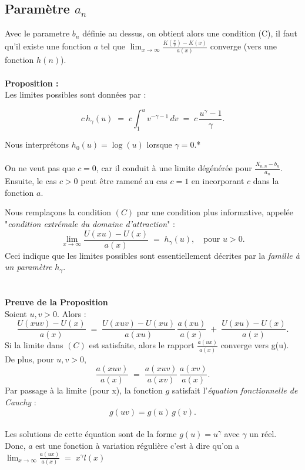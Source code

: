 \documentclass{article}
\begin{document}
\subsection{Paramètre $a_n$}
Avec le parametre $b_n$ définie au dessus, on obtient alors une condition (C), il faut qu'il existe une fonction $a$ tel que $\lim_{x \to \infty} \frac{K(\frac{x}{v}) - K(x)}{a(x)}$ converge (vers une fonction $h(n)$). 
\\
\\
\textbf{Proposition :}
\\
Les limites possibles sont données par :

\begin{equation}\label{eq:1.2}
    c\,h_{\gamma}(u) 
    \;=\; 
    c \int_{1}^{u} v^{-\gamma - 1}\,dv 
    \;=\; 
    c\,\frac{u^{\gamma} - 1}{\gamma}.
\end{equation}

Nous interprétons $h_{0}(u) = \log(u)$ lorsque $\gamma = 0$.*
\\
\\
\; On ne veut pas que $c=0$, car il conduit à une limite dégénérée pour $\frac{X_{n,n} - b_n}{a_n}$. 
Ensuite, le cas $c>0$ peut être ramené au cas $c=1$ en incorporant $c$ dans la fonction $a$. 

Nous remplaçons la condition $(C)$ par une condition plus informative, appelée 
"\textit{condition extrémale du domaine d’attraction}" :
\[
\lim_{x\to \infty} \frac{U(xu) - U(x)}{a(x)} 
\;=\; 
h_{\gamma}(u), 
\quad 
\text{pour } u>0.
\]
Ceci indique que les limites possibles sont essentiellement décrites par la \textit{famille à un paramètre} $h_{\gamma}$. 
\\
\\
\\
\textbf{Preuve de la Proposition}  
\\
Soient $u,v > 0$. Alors :
\[
\frac{U(xuv) - U(x)}{a(x)} 
\;=\; 
\frac{U(xuv) - U(xu)}{a(xu)} \,\frac{a(xu)}{a(x)}
\;+\;
\frac{U(xu) - U(x)}{a(x)}.
\tag{2.3}
\]
Si la limite dans $(C)$ est satisfaite, alors le rapport $\frac{a(ux)}{a(x)}$ converge vers g(u).
\\
De plus, pour $u,v>0$,
\[
\frac{a(xuv)}{a(x)} 
\;=\;
\frac{a(xuv)}{a(xv)} \,\frac{a(xv)}{a(x)}.
\]
Par passage à la limite (pour x), la fonction $g$ satisfait l'\textit{équation fonctionnelle de Cauchy} :
\[
g(uv) = g(u)\,g(v).
\]
\\
Les solutions de cette équation sont de la forme $g(u)= u^{\gamma}$ avec $\gamma$ un réel.
\\
Donc, $a$ est une fonction à variation régulière c'est à dire qu'on a $\lim_{x\to \infty} \frac{a(ux)}{a(x)} \;=\; x^{\gamma} l(x)$
\\
\\
\end{document}
